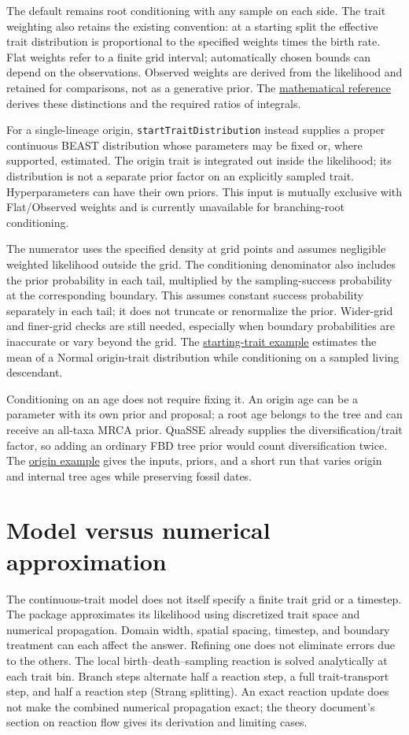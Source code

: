\documentclass[11pt]{article}
\begin{document}
The default remains root conditioning with any sample on each side. The trait weighting also
retains the existing convention: at a starting split the effective trait distribution is
proportional to the specified weights times the birth rate. Flat weights refer to a finite grid
interval; automatically chosen bounds can depend on the observations. Observed weights are derived
from the likelihood and retained for comparisons, not as a generative prior. The
\href{theory.pdf}{mathematical reference} derives these distinctions and the required
ratios of integrals.

For a single-lineage origin, \texttt{startTraitDistribution} instead supplies a proper continuous
BEAST distribution whose parameters may be fixed or, where supported, estimated. The origin trait
is integrated out inside the likelihood; its distribution is not a separate prior factor on an
explicitly sampled trait. Hyperparameters can have their own priors. This input is mutually
exclusive with Flat/Observed weights and is currently unavailable for branching-root conditioning.

The numerator uses the specified density at grid points and assumes negligible weighted
likelihood outside the grid. The conditioning denominator also includes the prior probability in
each tail, multiplied by the sampling-success probability at the corresponding boundary. This
assumes constant success probability separately in each tail; it does not truncate or renormalize
the prior. Wider-grid and finer-grid checks are still needed, especially when boundary probabilities
are inaccurate or vary beyond the grid. The
\href{../../examples/QuaSSE_origin_trait.xml}{starting-trait example} estimates the mean of a Normal
origin-trait distribution while conditioning on a sampled living descendant.

Conditioning on an age does not require fixing it. An origin age can be a parameter with its own
prior and proposal; a root age belongs to the tree and can receive an all-taxa MRCA prior. QuaSSE
already supplies the diversification/trait factor, so adding an ordinary FBD tree prior would count
diversification twice. The \href{../../examples/QuaSSE_origin.md}{origin example} gives the inputs,
priors, and a short run that varies origin and internal tree ages while preserving fossil dates.

\section{Model versus numerical approximation}
The continuous-trait model does not itself specify a finite trait grid or a timestep. The package
approximates its likelihood using discretized trait space and numerical propagation. Domain width,
spatial spacing, timestep, and boundary treatment can each affect the answer. Refining one does not
eliminate errors due to the others. The local birth--death--sampling reaction is solved
analytically at each trait bin. Branch steps alternate half a reaction step, a full trait-transport
step, and half a reaction step (Strang splitting). An exact reaction update does not make the
combined numerical propagation exact; the theory document's section on reaction flow gives
its derivation and limiting cases.
\end{document}
